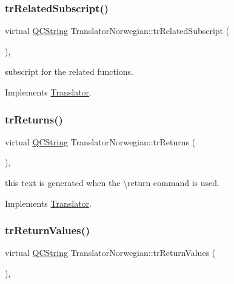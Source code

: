 \subsubsection{\texorpdfstring{trRelatedSubscript()}{trRelatedSubscript()}}
{\footnotesize\ttfamily virtual \mbox{\hyperlink{class_q_c_string}{Q\+C\+String}} Translator\+Norwegian\+::tr\+Related\+Subscript (\begin{DoxyParamCaption}{ }\end{DoxyParamCaption})\hspace{0.3cm}{\ttfamily [inline]}, {\ttfamily [virtual]}}

subscript for the related functions. 

Implements \mbox{\hyperlink{class_translator}{Translator}}.

\mbox{\label{class_translator_norwegian_a996a8f2034b0a0e979b5e09edaac9ce2}} 
\subsubsection{\texorpdfstring{trReturns()}{trReturns()}}
{\footnotesize\ttfamily virtual \mbox{\hyperlink{class_q_c_string}{Q\+C\+String}} Translator\+Norwegian\+::tr\+Returns (\begin{DoxyParamCaption}{ }\end{DoxyParamCaption})\hspace{0.3cm}{\ttfamily [inline]}, {\ttfamily [virtual]}}

this text is generated when the \textbackslash{}return command is used. 

Implements \mbox{\hyperlink{class_translator}{Translator}}.

\mbox{\label{class_translator_norwegian_a9b4ab20df4866fc01400711a887019c0}} 
\subsubsection{\texorpdfstring{trReturnValues()}{trReturnValues()}}
{\footnotesize\ttfamily virtual \mbox{\hyperlink{class_q_c_string}{Q\+C\+String}} Translator\+Norwegian\+::tr\+Return\+Values (\begin{DoxyParamCaption}{ }\end{DoxyParamCaption})\hspace{0.3cm}{\ttfamily [inline]}, {\ttfamily [virtual]}}

